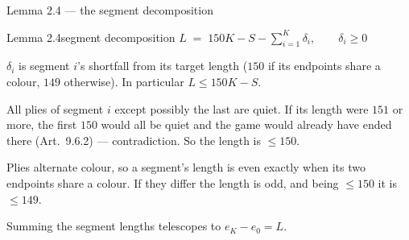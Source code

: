 \documentclass[aspectratio=169,10pt]{beamer}
\begin{document}
\begin{frame}{Lemma 2.4 --- the segment decomposition}
  \centering
  \vspace{0.35cm}
  \begin{lcstate}{Lemma 2.4}{segment decomposition}
    \centering
    $L \;=\; 150K - S - \displaystyle\sum_{i=1}^{K}\delta_i,
     \qquad \delta_i \ge 0$\par\medskip
    {\small $\delta_i$ is segment $i$'s shortfall from its target length
    ($150$ if its endpoints share a colour, $149$ otherwise).
    In particular $L \le 150K - S$.}
  \end{lcstate}
  \vspace{0.2cm}
  \begin{lcproof}
    \begin{lcsteps}
      \item All plies of segment $i$ except possibly the last are quiet. If
        its length were $151$ or more, the first $150$ would all be quiet
        and the game would already have ended there (Art.~9.6.2) ---
        contradiction. So the length is $\le 150$.
      \item Plies alternate colour, so a segment's length is even exactly
        when its two endpoints share a colour. If they differ the length is
        odd, and being $\le150$ it is $\le149$.
      \item Summing the segment lengths telescopes to $e_K-e_0=L$.
        \qedhere
    \end{lcsteps}
  \end{lcproof}
\end{frame}
\end{document}
